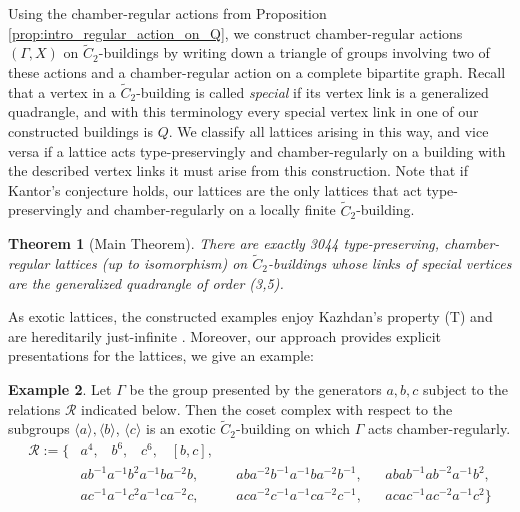 \documentclass[dvipsnames]{article}
\newtheorem{theorem}{Theorem}
\theoremstyle{definition}
\newtheorem{example}[theorem]{Example}
\theoremstyle{remark}
\begin{document}
    Using the chamber-regular actions from Proposition \ref{prop:intro_regular_action_on_Q}, we construct chamber-regular actions $(\Gamma,X)$ on $\tilde C_2$-buildings by writing down a triangle of groups involving two of these actions and a chamber-regular action on a complete bipartite graph.
    Recall that a vertex in a $\tilde C_2$-building is called \textit{special} if its vertex link is a generalized quadrangle, and with this terminology every special vertex link in one of our constructed buildings is $Q$. 
    We classify all lattices arising in this way, and vice versa if a lattice acts type-preservingly and chamber-regularly on a building with the described vertex links it must arise from this construction. Note that if Kantor's conjecture holds, our lattices are the only lattices that act type-preservingly and chamber-regularly on a locally finite $\tilde C_2$-building.
    \begin{theorem}[Main Theorem]\label{thm:main}
        There are exactly 3044 type-preserving, chamber-regular lattices (up to isomorphism) on $\tilde C_2$-buildings whose links of special vertices are the generalized quadrangle of order (3,5).
    \end{theorem}
    As exotic lattices, the constructed examples enjoy Kazhdan's property (T) \cite{Oppenheim} and are hereditarily just-infinite \cite{LecureuxWitzel}. Moreover, our approach provides explicit presentations for the lattices, we give an example:

    \begin{example}\label{exp:presentation_lattice}
        Let $\Gamma$ be the group presented by the generators $a,b,c$ subject to the relations $\mathcal R$ indicated below. Then the coset complex with respect to the subgroups $\langle a \rangle, \langle b \rangle$, $\langle c \rangle$ is an exotic $\tilde C_2$-building on which $\Gamma$ acts chamber-regularly. 
        \begin{align*}
            \mathcal R := \bigl \{
            & a^4, \;\;\; b^6, \;\;\; c^6, \;\;\; [b,c], \\
            & a  b^{-1} a^{-1}  b^2  a^{-1}  b  a^{-2}  b,
            && a  b  a^{-2}  b^{-1}  a^{-1}  b  a^{-2}  b^{-1},
            && a  b  a  b^{-1}  a  b^{-2}  a^{-1}  b^2,\\
            & a  c^{-1}  a^{-1}  c^2  a^{-1}  c  a^{-2}  c,
            && a  c  a^{-2}  c^{-1}  a^{-1}  c  a^{-2}  c^{-1},
            && a  c  a  c^{-1}  a  c^{-2}  a^{-1}  c^2  \bigr \}
        \end{align*}
    \end{example}
    
\end{document}
